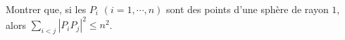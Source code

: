 Montrer que, si les $P_i$ $(i = 1, \cdots, n)$ sont des points d'une sphère de rayon $1$, alors $\sum_{i<j} |P_iP_j|^2 \leq n^2$.
